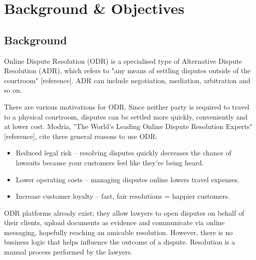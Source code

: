 \chapter{Background \& Objectives}


\section{Background} %

Online Dispute Resolution (ODR) is a specialised type of Alternative Dispute Resolution (ADR), which refers to "any means of settling disputes outside of the courtroom" [reference]. ADR can include negotiation, mediation, arbitration and so on. %

There are various motivations for ODR. Since neither party is required to travel to a physical courtroom, disputes can be settled more quickly, conveniently and at lower cost. Modria, "The World’s Leading Online Dispute Resolution Experts" [reference], cite three general reasons to use ODR: %

\begin{itemize}
    \item Reduced legal risk – resolving disputes quickly decreases the chance of lawsuits because your customers feel like they’re being heard.
    \item Lower operating costs – managing disputes online lowers travel expenses.
    \item Increase customer loyalty – fast, fair resolutions = happier customers.
\end{itemize}

ODR platforms already exist; they allow lawyers to open disputes on behalf of their clients, upload documents as evidence and communicate via online messaging, hopefully reaching an amicable resolution. However, there is no business logic that helps influence the outcome of a dispute. Resolution is a manual process performed by the lawyers.

